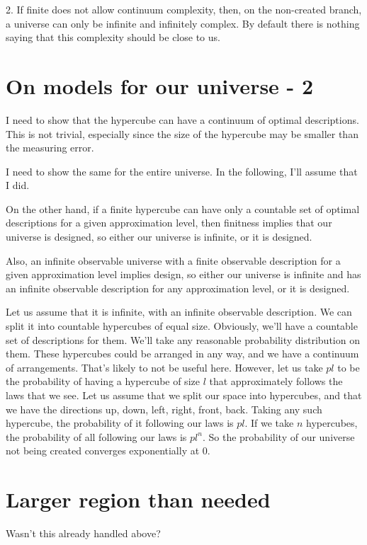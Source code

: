 \documentclass[a4paper
,draft
]{article}
\begin{document}
2. If finite does not allow continuum complexity, then, on the non-created branch, a universe can only be infinite and infinitely complex. By default there is nothing saying that this complexity should be close to us.

\section{On models for our universe - 2}

I need to show that the hypercube can have a continuum of optimal descriptions. This is not trivial, especially since the size of the hypercube may be smaller than the measuring error.

I need to show the same for the entire universe. In the following, I'll assume that I did.

On the other hand, if a finite hypercube can have only a countable set of optimal descriptions for a given approximation level, then finitness implies that our universe is designed, so either our universe is infinite, or it is designed.

Also, an infinite observable universe with a finite observable description for a given approximation level implies design, so either our universe is infinite and has an infinite observable description for any approximation level, or it is designed.

Let us assume that it is infinite, with an infinite observable description. We can split it into countable hypercubes of equal size. Obviously, we'll have a countable set of descriptions for them. We'll take any reasonable probability distribution on them. These hypercubes could be arranged in any way, and we have a continuum of arrangements. That's likely to not be useful here. However, let us take $pl$ to be the probability of having a hypercube of size $l$ that approximately follows the laws that we see. Let us assume that we split our space into hypercubes, and that we have the directions up, down, left, right, front, back. Taking any such hypercube, the probability of it following our laws is $pl$. If we take $n$ hypercubes, the probability of all following our laws is $pl^n$. So the probability of our universe not being created converges exponentially at $0$.

\section{Larger region than needed}

Wasn't this already handled above?
\end{document}
